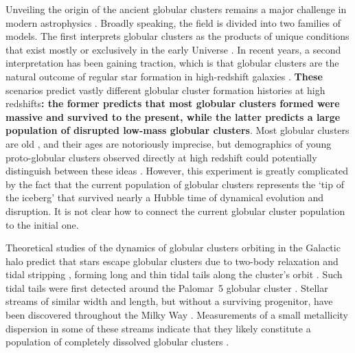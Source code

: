 \documentclass[twocolumn]{aastex63}
\newcommand{\jwst}{\textsl{JWST}}
\newcommand{\gyr}{\ensuremath{\textrm{Gyr}}}
\newcommand{\changes}[1]{{\textbf{#1}}}
\begin{document}
Unveiling the origin of the ancient globular clusters remains a major challenge in modern astrophysics \citep[e.g.][]{brodie:2006,kruijssen:2014,renaud:2017,forbes:2018,adamo:2020}.
Broadly speaking, the field is divided into two families of models.
The first interprets globular clusters as the products of unique conditions that exist mostly or exclusively in the early Universe \citep[e.g.][]{peebles:1968,fall:1985,ashman:1992,trenti:2015,madau:2020}.
In recent years, a second interpretation has been gaining traction, which is that globular clusters are the natural outcome of regular star formation in high-redshift galaxies \citep[e.g.][]{kravtsov:2005,kruijssen15b,pfeffer:2018,keller:2020}.
\changes{These} scenarios predict vastly different globular cluster formation histories at high redshifts\changes{: the former predicts that most globular clusters formed were massive and survived to the present, while the latter predicts a large population of disrupted low-mass globular clusters}.
Most globular clusters are old \citep[$\gtrsim10\,\gyr$,][]{marinfranch09, dotter10, dotter11, vandenberg13, leaman:2013}, and their ages are notoriously imprecise, but demographics of young proto-globular clusters observed directly at high redshift could potentially distinguish between these ideas \citep[e.g., with the upcoming \textsl{James Webb Space Telescope}, \jwst,][]{gardner:2006}.
However, this experiment is greatly complicated by the fact that the current population of globular clusters represents the `tip of the iceberg' that survived nearly a Hubble time of dynamical evolution and disruption.
It is not clear how to connect the current globular cluster population to the initial one.

Theoretical studies of the dynamics of globular clusters orbiting in the Galactic halo predict that stars escape globular clusters due to two-body relaxation and tidal stripping \citep[often referred to as `evaporation', e.g.,][]{spitzer:1987, baumgardt03}, forming long and thin tidal tails along the cluster's orbit \citep{combes:1999}.
Such tidal tails were first detected around the Palomar~5 globular cluster \citep{odenkirchen:2001, rockosi:2002}.
Stellar streams of similar width and length, but without a surviving progenitor, have been discovered throughout the Milky Way \citep[e.g.,][]{gd:2006, grillmair:2009, bonaca:2012, balbinot:2016, bernard:2016, shipp:2018, malhan:2018, ibata:2019, caldwell:2020}.
Measurements of a small metallicity dispersion in some of these streams indicate that they likely constitute a population of completely dissolved globular clusters \citep{li:2017,bonaca:2020b, hansen:2020, ji:2020}.
\end{document}
